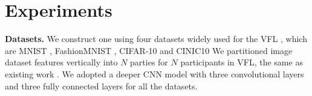 




\section{Experiments} \label{sec: exper}







\noindent\textbf{Datasets.}
We construct one using four datasets widely used for the VFL  \cite{das2021multi,wang2024unified}, which are MNIST \cite{baldominos2019survey}, FashionMNIST \cite{xiao2017fashion}, CIFAR-10 \cite{abouelnaga2016cifar} and CINIC10 \cite{NEURIPS2021_2f2b2656}
We partitioned image dataset features vertically into $N$ parties for $N$ participants in VFL, the same as existing work \cite{qiu2024integer}.
We adopted a deeper CNN model with three convolutional layers and three fully connected layers for all the datasets.









